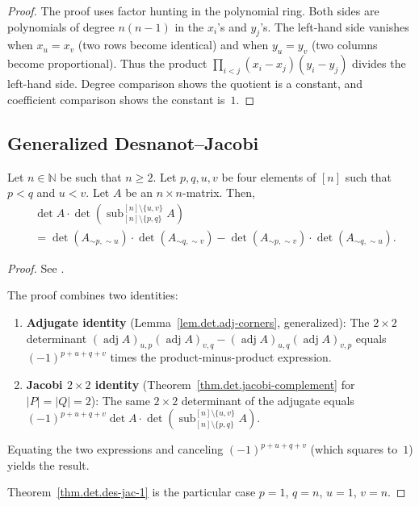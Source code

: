 \begin{proof}
The proof uses factor hunting in the polynomial ring. Both sides are polynomials
of degree $n(n-1)$ in the $x_i$'s and $y_j$'s. The left-hand side vanishes
when $x_u = x_v$ (two rows become identical) and when $y_u = y_v$ (two columns
become proportional). Thus the product
$\prod_{i < j} (x_i - x_j)(y_i - y_j)$ divides the left-hand side.
Degree comparison shows the quotient is a constant, and coefficient
comparison shows the constant is~$1$.
\end{proof}

\subsection{Generalized Desnanot--Jacobi}

\begin{theorem}
\label{thm.det.des-jac-2}
\leantarget
\leanok
Let $n \in \mathbb{N}$ be such that $n \geq 2$. Let $p, q, u, v$ be four
elements of $[n]$ such that $p < q$ and $u < v$. Let $A$ be an
$n \times n$-matrix. Then,
\begin{align*}
  & \det A \cdot \det\left( \operatorname{sub}_{[n] \setminus \{p, q\}}^{[n] \setminus \{u, v\}} A \right) \\
  &= \det(A_{\sim p, \sim u}) \cdot \det(A_{\sim q, \sim v})
     - \det(A_{\sim p, \sim v}) \cdot \det(A_{\sim q, \sim u}).
\end{align*}
\end{theorem}

\begin{proof}
See \cite[Theorem 6.126]{detnotes}.

The proof combines two identities:
\begin{enumerate}
\item \textbf{Adjugate identity} (Lemma~\ref{lem.det.adj-corners}, generalized): The $2 \times 2$
      determinant
      $(\operatorname{adj} A)_{u,p} (\operatorname{adj} A)_{v,q}
       - (\operatorname{adj} A)_{u,q} (\operatorname{adj} A)_{v,p}$
      equals $(-1)^{p+u+q+v}$ times the product-minus-product expression.

\item \textbf{Jacobi $2 \times 2$ identity} (Theorem~\ref{thm.det.jacobi-complement} for $|P|=|Q|=2$): The same
      $2 \times 2$ determinant of the adjugate equals
      $(-1)^{p+u+q+v} \det A \cdot \det(\operatorname{sub}_{[n] \setminus \{p,q\}}^{[n] \setminus \{u,v\}} A)$.
\end{enumerate}
Equating the two expressions and canceling $(-1)^{p+u+q+v}$ (which squares to~$1$)
yields the result.

Theorem~\ref{thm.det.des-jac-1} is the particular case $p = 1$, $q = n$,
$u = 1$, $v = n$.
\end{proof}

